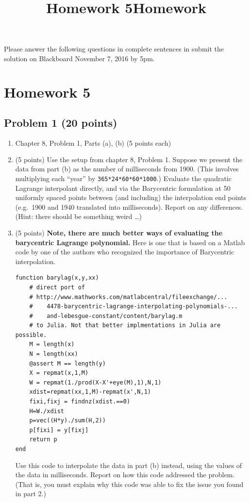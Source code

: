 \documentclass[]{article}
\title{Homework 5}
\title{Homework}
\begin{document}
\maketitle

Please answer the following questions in complete sentences in submit
the solution on Blackboard November 7, 2016 by 5pm.

\section{Homework 5}\label{homework-5}

\subsection{Problem 1 (20 points)}\label{problem-1-20-points}

\begin{enumerate}
\def\labelenumi{\arabic{enumi}.}
\item
  Chapter 8, Problem 1, Parts (a), (b) (5 points each)
\item
  (5 points) Use the setup from chapter 8, Problem 1. Suppose we present
  the data from part (b) as the number of milliseconds from 1900. (This
  involves multiplying each ``year'' by \texttt{365*24*60*60*1000}.)
  Evaluate the quadratic Lagrange interpolant directly, and via the
  Barycentric formulation at 50 uniformly spaced points between (and
  including) the interpolation end points (e.g.~1900 and 1940 translated
  into milliseconds). Report on any differences. (Hint: there should be
  something weird \ldots{})
\item
  (5 points) \textbf{Note, there are much better ways of evaluating the
  barycentric Lagrange polynomial.} Here is one that is based on a
  Matlab code by one of the authors who recognized the importance of
  Barycentric interpolation.

\begin{verbatim}
function barylag(x,y,xx)
    # direct port of 
    # http://www.mathworks.com/matlabcentral/fileexchange/...
    #    4478-barycentric-lagrange-interpolating-polynomials-...
    #    and-lebesgue-constant/content/barylag.m
    # to Julia. Not that better implmentations in Julia are possible.
    M = length(x)
    N = length(xx)
    @assert M == length(y)
    X = repmat(x,1,M)
    W = repmat(1./prod(X-X'+eye(M),1),N,1)
    xdist=repmat(xx,1,M)-repmat(x',N,1)
    fixi,fixj = findnz(xdist.==0)
    H=W./xdist
    p=vec((H*y)./sum(H,2))
    p[fixi] = y[fixj]
    return p
end
\end{verbatim}

  Use this code to interpolate the data in part (b) instead, using the
  values of the data in milliseconds. Report on how this code addressed
  the problem. (That is, you must explain why this code was able to fix
  the issue you found in part 2.)
\end{enumerate}
\end{document}
